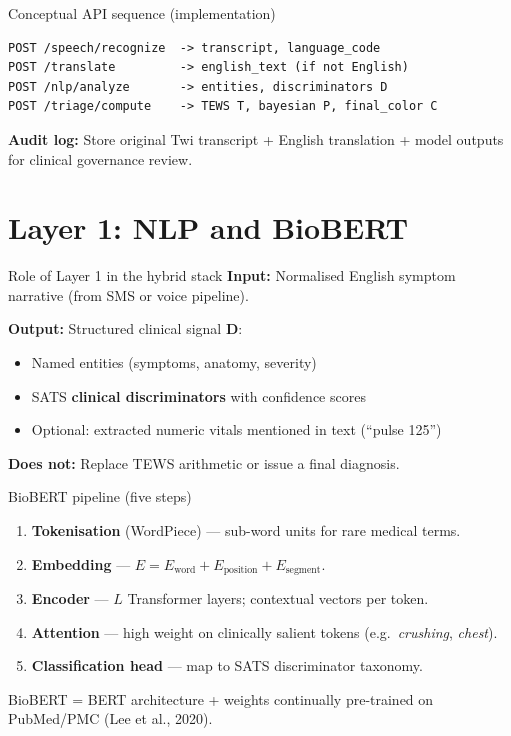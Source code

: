 \documentclass[aspectratio=169,11pt]{beamer}
\begin{document}
\begin{frame}[fragile]{Conceptual API sequence (implementation)}
	\footnotesize
	\begin{verbatim}
POST /speech/recognize  -> transcript, language_code
POST /translate         -> english_text (if not English)
POST /nlp/analyze       -> entities, discriminators D
POST /triage/compute    -> TEWS T, bayesian P, final_color C
	\end{verbatim}

	\vspace{0.3em}
	\textbf{Audit log:} Store original Twi transcript + English translation + model outputs for clinical governance review.
\end{frame}

\section{Layer 1: NLP and BioBERT}

\begin{frame}{Role of Layer 1 in the hybrid stack}
	\textbf{Input:} Normalised English symptom narrative (from SMS or voice pipeline).

	\textbf{Output:} Structured clinical signal $\mathbf{D}$:
	\begin{itemize}
		\item Named entities (symptoms, anatomy, severity)
		\item SATS \textbf{clinical discriminators} with confidence scores
		\item Optional: extracted numeric vitals mentioned in text (``pulse 125'')
	\end{itemize}

	\textbf{Does not:} Replace TEWS arithmetic or issue a final diagnosis.
\end{frame}

\begin{frame}{BioBERT pipeline (five steps)}
	\begin{enumerate}
		\item \textbf{Tokenisation} (WordPiece) --- sub-word units for rare medical terms.
		\item \textbf{Embedding} --- $E = E_{\text{word}} + E_{\text{position}} + E_{\text{segment}}$.
		\item \textbf{Encoder} --- $L$ Transformer layers; contextual vectors per token.
		\item \textbf{Attention} --- high weight on clinically salient tokens (e.g.\ \textit{crushing}, \textit{chest}).
		\item \textbf{Classification head} --- map to SATS discriminator taxonomy.
	\end{enumerate}

	\vspace{0.3em}
	BioBERT = BERT architecture + weights continually pre-trained on PubMed/PMC (Lee et al., 2020).
\end{frame}
\end{document}
